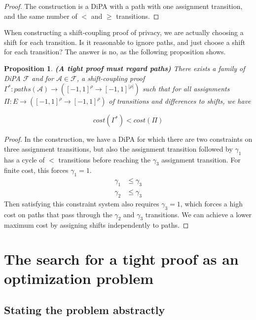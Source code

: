 \documentclass{article}
\newtheorem{proposition}{Proposition}[section]
\newcommand{\1}{\langle 1 \rangle}
\newcommand{\2}{\langle 2 \rangle}
\begin{document}
\begin{proof}
    The construction is a DiPA with a path with one assignment transition, and the same number of $<$ and $\geq$ transitions.
\end{proof}

When constructing a shift-coupling proof of privacy, we are actually choosing a shift for each transition. Is it reasonable to ignore paths, and just choose a shift for each transition? The answer is no, as the following proposition shows.

\begin{proposition}
    \label{prop:proofs_must_regard_paths}
    \textbf{(A tight proof must regard paths)} There exists a family of DiPA $\mathcal{F}$ and for $\mathcal{A} \in \mathcal{F}$, a shift-coupling proof $\Gamma^*: paths(\mathcal{A}) \to ([-1, 1]^{\rho} \to [-1, 1]^{|\rho|})$ such that for all assignments $\Pi: E \to ([-1, 1]^{\rho} \to [-1, 1]^{\rho})$ of transitions and differences to shifts, we have

    \[cost(\Gamma^*) < cost(\Pi)\]
\end{proposition}

\begin{proof}
    In the construction, we have a DiPA for which there are two constraints on three assignment transitions, but also the assignment transition followed by $\gamma_1$ has a cycle of $<$ transitions before reaching the $\gamma_3$ assignment transition. For finite cost, this forces $\gamma_1 = 1$.
    \begin{align*}
        \gamma_1 &\leq \gamma_3 \\
        \gamma_2 &\leq \gamma_3
    \end{align*}
    Then satisfying this constraint system also requires $\gamma_3 = 1$, which forces a high cost on paths that pass through the $\gamma_2$ and $\gamma_3$ transitions. We can achieve a lower maximum cost by assigning shifts independently to paths. 
\end{proof}

\section{The search for a tight proof as an optimization problem}

\subsection{Stating the problem abstractly}
\end{document}
